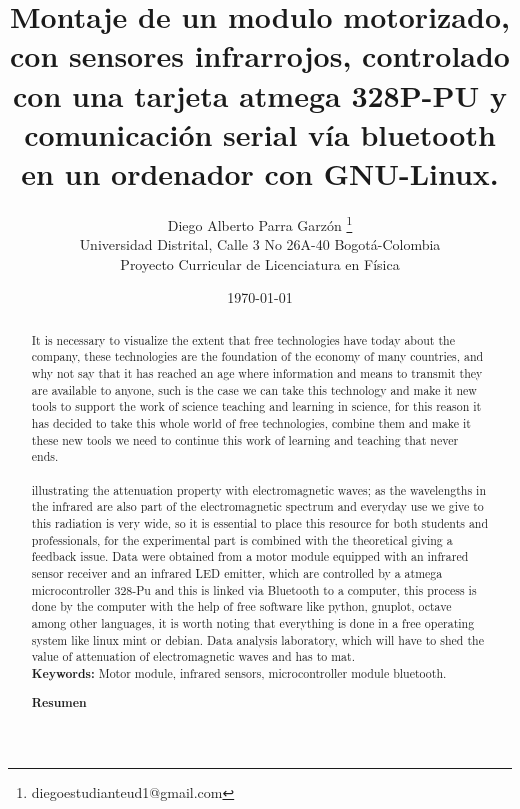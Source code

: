 \documentclass[12]{article}
\title{\bf{Montaje de un modulo motorizado, con sensores infrarrojos, controlado con una tarjeta atmega 328P-PU y comunicación serial vía bluetooth en un ordenador con GNU-Linux.}}
\author{Diego Alberto Parra Garzón \footnote{diegoestudianteud1@gmail.com} \\ Universidad Distrital, Calle 3 No 26A-40 Bogotá-Colombia \\    Proyecto Curricular de Licenciatura en Física }
\date{\today}
\def\tablename{Tabla}%
\begin{document}
\renewcommand{\tablename}{Tabla}
\maketitle
\vspace{-0.8cm}

\begin{abstract}
It is necessary to visualize the extent that free technologies have today about the company, these technologies are the foundation of the economy of many countries, and why not say that it has reached an age where information and means to transmit they are available to anyone, such is the case we can take this technology and make it new tools to support the work of science teaching and learning in science, for this reason it has decided to take this whole world of free technologies, combine them and make it these new tools we need to continue this work of learning and teaching that never ends.\\ \\
illustrating the attenuation property with electromagnetic waves; as the wavelengths in the infrared are also part of the electromagnetic spectrum and everyday use we give to this radiation is very wide, so it is essential to place this resource for both students and professionals, for the experimental part is combined with the theoretical giving a feedback issue. Data were obtained from a motor module equipped with an infrared sensor receiver and an infrared LED emitter, which are controlled by a atmega microcontroller 328-Pu and this is linked via Bluetooth to a computer, this process is done by the computer with the help of free software like python, gnuplot, octave among other languages, it is worth noting that everything is done in a free operating system like linux mint or debian. Data analysis laboratory, which will have to shed the value of attenuation of electromagnetic waves and has to mat.\\ 
{\bf{Keywords:}} Motor module, infrared sensors, microcontroller module bluetooth.


\begin{center}
{\bf{Resumen}} 
\end{center}


\end{abstract}
\end{document}
